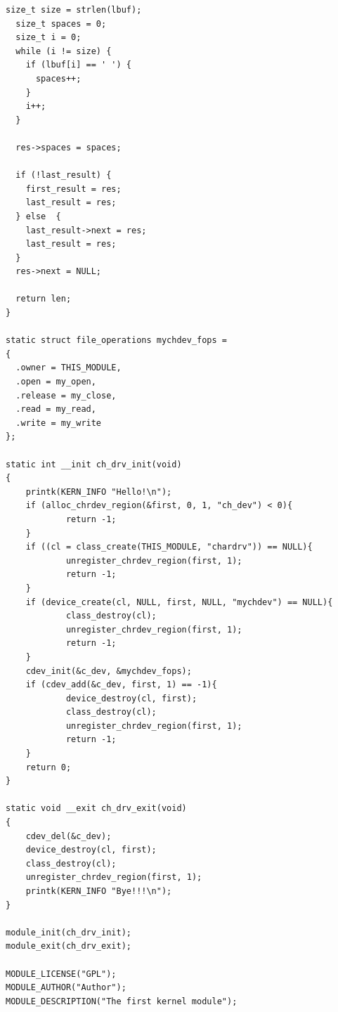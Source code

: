 \documentclass{article}
\begin{document}
\begin{lstlisting}[caption={ch\_drv.c}, label={lst:example}]
  size_t size = strlen(lbuf);
  size_t spaces = 0;
  size_t i = 0;
  while (i != size) {
    if (lbuf[i] == ' ') {
      spaces++;
    }
    i++;
  }

  res->spaces = spaces;

  if (!last_result) {
    first_result = res;
    last_result = res;
  } else  {
    last_result->next = res;
    last_result = res;
  }
  res->next = NULL;

  return len;
}

static struct file_operations mychdev_fops =
{
  .owner = THIS_MODULE,
  .open = my_open,
  .release = my_close,
  .read = my_read,
  .write = my_write
};
 
static int __init ch_drv_init(void)
{
    printk(KERN_INFO "Hello!\n");
    if (alloc_chrdev_region(&first, 0, 1, "ch_dev") < 0){
            return -1;
    }
    if ((cl = class_create(THIS_MODULE, "chardrv")) == NULL){
            unregister_chrdev_region(first, 1);
            return -1;
    }
    if (device_create(cl, NULL, first, NULL, "mychdev") == NULL){
            class_destroy(cl);
            unregister_chrdev_region(first, 1);
            return -1;
    }
    cdev_init(&c_dev, &mychdev_fops);
    if (cdev_add(&c_dev, first, 1) == -1){
            device_destroy(cl, first);
            class_destroy(cl);
            unregister_chrdev_region(first, 1);
            return -1;
    }
    return 0;
}
 
static void __exit ch_drv_exit(void)
{
    cdev_del(&c_dev);
    device_destroy(cl, first);
    class_destroy(cl);
    unregister_chrdev_region(first, 1);
    printk(KERN_INFO "Bye!!!\n");
}
 
module_init(ch_drv_init);
module_exit(ch_drv_exit);
 
MODULE_LICENSE("GPL");
MODULE_AUTHOR("Author");
MODULE_DESCRIPTION("The first kernel module");
\end{lstlisting}
\end{document}
